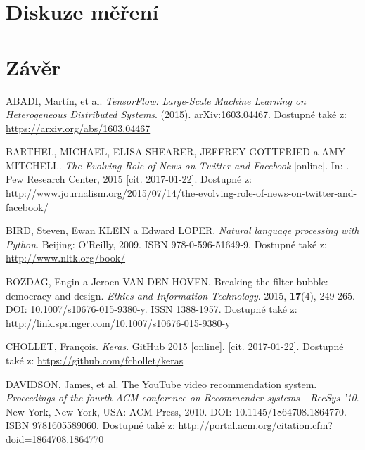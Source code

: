 \documentclass[12pt, a4paper]{article}
\numberwithin{equation}{section} 	%
\begin{document}
\section{Diskuze měření}




\newpage
\section{Závěr}
\noindent

\newpage
\begin{thebibliography}{99}

    ABADI, Martín, et al. \textit{TensorFlow: Large-Scale Machine Learning on Heterogeneous Distributed Systems}. (2015). arXiv:1603.04467. Dostupné také z: \url{https://arxiv.org/abs/1603.04467}

    BARTHEL, MICHAEL, ELISA SHEARER, JEFFREY GOTTFRIED a AMY MITCHELL. \textit{The Evolving Role of News on Twitter and Facebook} [online]. In: . Pew Research Center, 2015 [cit. 2017-01-22]. Dostupné z: \url{http://www.journalism.org/2015/07/14/the-evolving-role-of-news-on-twitter-and-facebook/}

    BIRD, Steven, Ewan KLEIN a Edward LOPER. \textit{Natural language processing with Python}. Beijing: O'Reilly, 2009. ISBN 978-0-596-51649-9. Dostupné také z: \url{http://www.nltk.org/book/}

    BOZDAG, Engin a Jeroen VAN DEN HOVEN. Breaking the filter bubble: democracy and design. \textit{Ethics and Information Technology}. 2015, \textbf{17}(4), 249-265. DOI: 10.1007/s10676-015-9380-y. ISSN 1388-1957. Dostupné také z: \url{http://link.springer.com/10.1007/s10676-015-9380-y}

    CHOLLET, Fran\c{c}ois. \textit{Keras}. GitHub 2015 [online]. [cit. 2017-01-22]. Dostupné také z: \url{https://github.com/fchollet/keras}

    DAVIDSON, James, et al. The YouTube video recommendation system. \textit{Proceedings of the fourth ACM conference on Recommender systems - RecSys '10}. New York, New York, USA: ACM Press, 2010. DOI: 10.1145/1864708.1864770. ISBN 9781605589060. Dostupné také z: \url{http://portal.acm.org/citation.cfm?doid=1864708.1864770}


\end{thebibliography}
\end{document}
